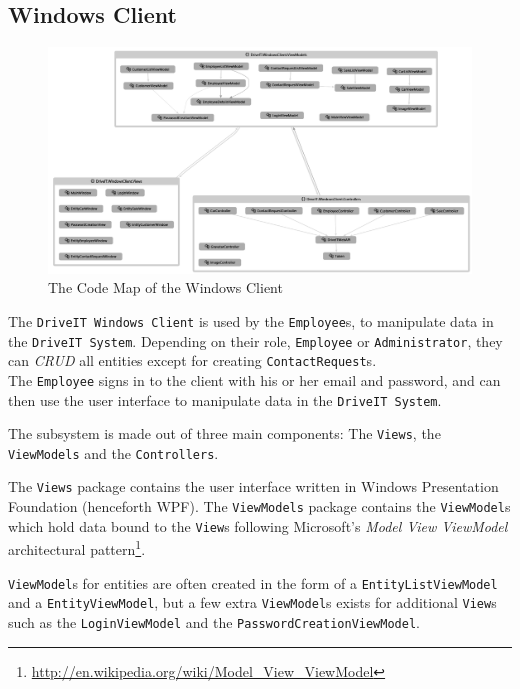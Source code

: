 \subsection{Windows Client} 
\begin{figure}[H]
	\centering
	\includegraphics[width=\textwidth]{Figures/WindowsClientCodeMap}
	\caption{The Code Map of the Windows Client}
	\label{fig:WindowsClientCodeMapProper}
\end{figure}
The \texttt{DriveIT Windows Client} is used by the \texttt{Employee}s, to manipulate data in the \texttt{DriveIT System}. Depending on their role, \texttt{Employee} or \texttt{Administrator}, they can \textit{CRUD} all entities except for creating \texttt{ContactRequest}s.\\

The \texttt{Employee} signs in to the client with his or her email and password, and can then use the user interface to manipulate data in the \texttt{DriveIT System}.

The subsystem is made out of three main components: The \texttt{Views}, the \texttt{ViewModels} and the \texttt{Controllers}.

The \texttt{Views} package contains the user interface written in Windows Presentation Foundation (henceforth WPF). The \texttt{ViewModels} package contains the \texttt{ViewModel}s which hold data bound to the \texttt{View}s following Microsoft's \textit{Model View ViewModel} architectural pattern\footnote{\url{http://en.wikipedia.org/wiki/Model_View_ViewModel}}.

\texttt{ViewModel}s for entities are often created in the form of a \texttt{EntityListViewModel} and a \texttt{EntityViewModel}, but a few extra \texttt{ViewModel}s exists for additional \texttt{View}s such as the \texttt{LoginViewModel} and the \texttt{PasswordCreationViewModel}.

